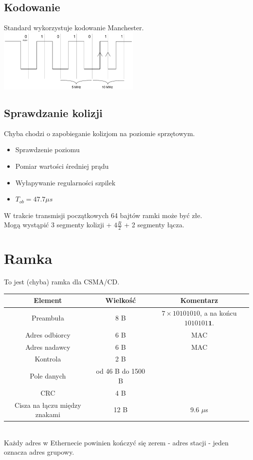 \documentclass[a4paper,twoside]{article}
\begin{document}
	\subsection{Kodowanie}
		Standard wykorzystuje kodowanie Manchester.\\
		\includegraphics[width=7cm]{./images/image28.pdf}
	\subsection{Sprawdzanie kolizji}
		Chyba chodzi o zapobieganie kolizjom na poziomie sprzętowym.
		\begin{itemize}
			\item Sprawdzenie poziomu
			\item Pomiar wartości średniej prądu
			\item Wyłapywanie regularności szpilek
			\item $ T_{ob}=47.7 \mu{s} $
		\end{itemize}
		W trakcie transmisji początkowych 64 bajtów ramki może być złe.\\
		Mogą wystąpić 3 segmenty kolizji + $ 4 \frac{R}{2} $ + 2 segmenty łącza.
\section{Ramka}
	To jest (chyba) ramka dla CSMA/CD.\\
	\begin{table}[h]
		\begin{tabular}{|c|c|c|}
			\hline
			\textbf{Element} & Wielkość & \textbf{Komentarz} \\ \hline
			\multicolumn{1}{|c|}{Preambuła} 	& 8 B & $ 7\times 10101010$, a na końcu $ 1010101\textbf{1} $. \\ \hline
			\multicolumn{1}{|c|}{Adres odbiorcy}	& 6 B &	MAC \\ \hline
			\multicolumn{1}{|c|}{Adres nadawcy}	& 6 B &	MAC \\ \hline
			\multicolumn{1}{|c|}{Kontrola}		& 2 B & 	\\ \hline
			\multicolumn{1}{|c|}{Pole danych}	& od 46 B do 1500 B	& \\ \hline
			\multicolumn{1}{|c|}{CRC}			& 4 B & \\ \hline
			Cisza na łączu między znakami		& 12 B & 9.6 $ \mu $s \\ \hline
		\end{tabular}
	\end{table}\\
	Każdy adres w Ethernecie powinien kończyć się zerem - adres stacji - jeden oznacza adres grupowy.
\end{document}
